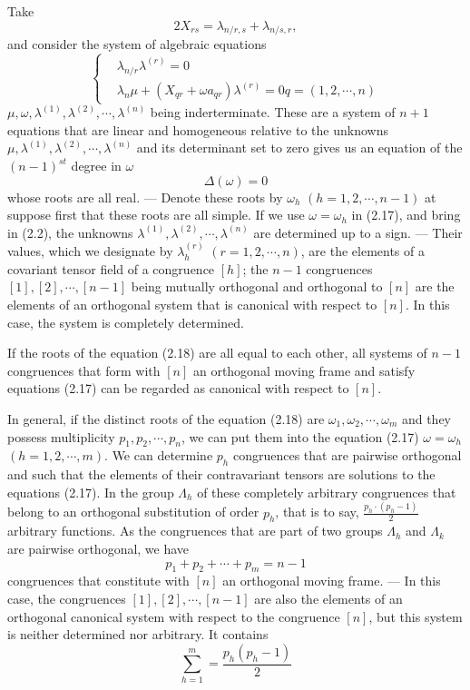 \documentclass{book}
\begin{document}
Take
$$2X_{rs}=\lambda_{n/r,s}+\lambda_{n/s,r},$$
and consider the system of algebraic equations
\begin{equation}
\begin{cases}
	&\lambda_{n/r}\lambda^{(r)}=0\text{}\\
	&\lambda_n\mu+(X_{qr}+\omega a_{qr})\lambda^{(r)}=0 \text{$q=(1,2,\cdots,n)$}
\end{cases}
\end{equation}
$\mu,\omega,\lambda^{(1)},\lambda^{(2)},\cdots,\lambda^{(n)}$ being inderterminate. These are a system of $n+1$ equations that are linear and homogeneous relative to the unknowns\\ $\mu,\lambda^{(1)},\lambda^{(2)},\cdots,\lambda^{(n)}$ and its determinant set to zero gives us an equation of the $(n-1)^{st}$ degree in $\omega$
\begin{equation}
\Delta(\omega)=0
\end{equation}
whose roots are all real. --- Denote these roots by $\omega_h$ $(h=1,2,\cdots,n-1)$ at suppose first that these roots are all simple. If we use $\omega=\omega_h$ in (2.17), and bring in (2.2), the unknowns $\lambda^{(1)},\lambda^{(2)},\cdots,\lambda^{(n)}$ are determined up to a sign. --- Their values, which we designate by $\lambda_h^{(r)}$ $(r=1,2,\cdots,n)$, are the elements of a covariant tensor field of a congruence $[h]$; the $n-1$ congruences $[1],[2],\cdots,[n-1]$ being mutually orthogonal and orthogonal to $[n]$ are the elements of an orthogonal system that is canonical with respect to $[n]$. In this case, the system is completely determined. 

If the roots of the equation (2.18) are all equal to each other, all systems of $n-1$ congruences that form with $[n]$ an orthogonal moving frame and satisfy equations (2.17) can be regarded as canonical with respect to $[n]$. 

In general, if the distinct roots of the equation (2.18) are $\omega_1,\omega_2,\cdots,\omega_m$ and they possess multiplicity $p_1,p_2,\cdots,p_n$, we can put them into the equation (2.17) $\omega=\omega_h$ $(h=1,2,\cdots,m)$. We can determine $p_h$ congruences that are pairwise orthogonal and such that the elements of their contravariant tensors are solutions to the equations (2.17). In the group $\Lambda_h$ of these completely arbitrary congruences that belong to an orthogonal substitution of order $p_h$, that is to say, $\displaystyle\frac{p_h\cdot(p_h-1)}{2}$ arbitrary functions. As the congruences that are part of two groups $\Lambda_h$ and $\Lambda_k$ are pairwise orthogonal, we have
$$p_1+p_2+\cdots+p_m=n-1$$
congruences that constitute with $[n]$ an orthogonal moving frame. --- In this case, the congruences $[1],[2],\cdots,[n-1]$ are also the elements of an orthogonal canonical system with respect to the congruence $[n]$, but this system is neither determined nor arbitrary. It contains
$$\sum_{h=1}^m=\frac{p_h(p_h-1)}{2}$$
\end{document}
